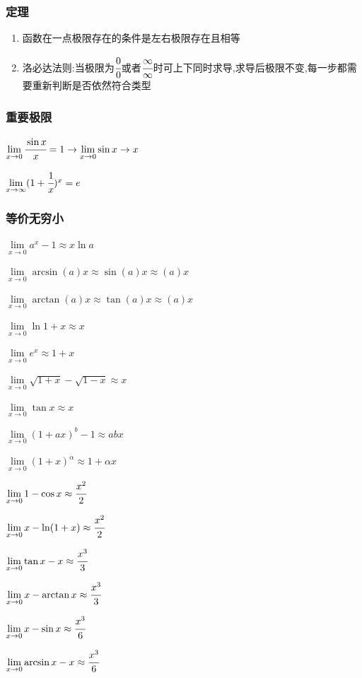 \documentclass[UTF8,12pt]{ctexbook}
\newcommand{\limNormal}[1]{\lim\limits_{#1}}
\newcommand{\myLimToZero}{\limNormal{x \to 0}}
\newcommand{\myLimToInf}{\limNormal{x \to \infty}}
\begin{document}
{{{  \subsubsection{定理}{
    \begin{enumerate}
      \item 函数在一点极限存在的条件是左右极限存在且相等
      \item 洛必达法则:当极限为$\cfrac{0}{0}$或者$\cfrac{\infty}{\infty}$时可上下同时求导,求导后极限不变,每一步都需要重新判断是否依然符合类型
    \end{enumerate}
  }%

  \subsubsection{重要极限}{
    $\myLimToZero\cfrac{\sin{x}}{x}=1 \to \limNormal{x \to 0}\sin{x} \to x$

    $\myLimToInf(1+\cfrac{1}{x})^x = e$
  }%

  \subsubsection{等价无穷小}{
    $\myLimToZero a^x - 1 \approx x\ln{a}$

    $\myLimToZero \arcsin(a)x \approx \sin(a)x \approx (a)x$

    $\myLimToZero \arctan(a)x \approx \tan(a)x \approx (a)x$

    $\myLimToZero \ln1+x \approx x$

    $\myLimToZero e^x \approx 1+x$

    $\myLimToZero \sqrt{1 + x} - \sqrt{1 - x} \approx x$

    $\myLimToZero \tan{x} \approx x$

    $\myLimToZero (1 + ax)^b - 1 \approx abx$

    $\myLimToZero (1+x)^\alpha \approx 1+\alpha x$

    $\myLimToZero 1 - \cos x \approx \cfrac{x^2}{2}$

    $\myLimToZero x - \ln(1 + x) \approx \cfrac{x^2}{2}$

    $\myLimToZero \tan x - x \approx \cfrac{x^3}{3}$

    $\myLimToZero x - \arctan x \approx \cfrac{x^3}{3}$

    $\myLimToZero x - \sin x \approx \cfrac{x^3}{6}$

    $\myLimToZero \arcsin x - x \approx \cfrac{x^3}{6}$

}}}}
\end{document}
